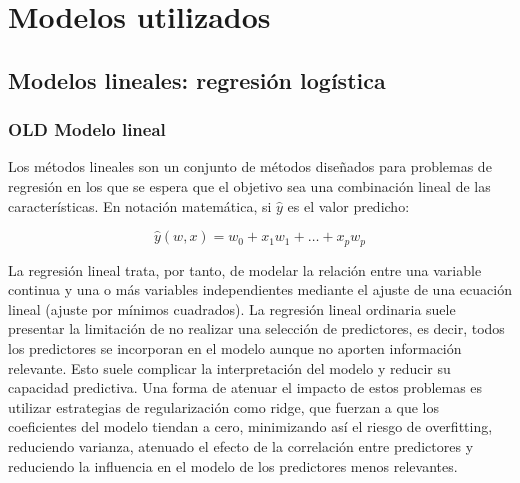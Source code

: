 
\section{Modelos utilizados}
\label{sec:models}


\color{Purple}
\subsection{Modelos lineales: regresión logística}
\subsubsection{OLD Modelo lineal}

Los métodos lineales son un conjunto de métodos diseñados para problemas de regresión en los que se espera que el objetivo sea una combinación lineal de las características.
En notación matemática, si $\hat{y}$ es el valor predicho:

\begin{equation}
    \hat{y}(w,x)=w_{0} + x_{1}w_{1} + \dots + x_{p}w_{p}
\end{equation}

La regresión lineal trata, por tanto, de modelar la relación entre una variable continua y una o más variables independientes mediante el ajuste de una ecuación lineal (ajuste por mínimos cuadrados). 
La regresión lineal ordinaria suele presentar la limitación de no realizar una selección de predictores, es decir, todos los predictores se incorporan en el modelo aunque no aporten información relevante. Esto suele complicar la interpretación del modelo y reducir su capacidad predictiva.
Una forma de atenuar el impacto de estos problemas es utilizar estrategias de regularización como ridge, que fuerzan a que los coeficientes del modelo tiendan a cero, minimizando así el riesgo de overfitting, reduciendo varianza, atenuado el efecto de la correlación entre predictores y reduciendo la influencia en el modelo de los predictores menos relevantes.

